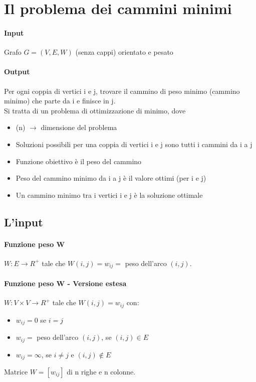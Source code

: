 \section{Il problema dei cammini minimi}
\paragraph*{Input} Grafo $G=(V,E,W)$ (senza cappi) orientato e pesato
\paragraph*{Output} Per ogni coppia di vertici i e j, trovare il cammino di peso minimo (cammino minimo)
che parte da i e finisce in j.\\
Si tratta di un problema di ottimizzazione di minimo, dove
\begin{itemize}
    \item (n) $\rightarrow$ dimensione del problema
    \item Soluzioni possibili per una coppia di vertici i e j sono tutti i cammini da i a j
    \item Funzione obiettivo è il peso del cammino
    \item Peso del cammino minimo da i a j è il valore ottimi (per i e j)
    \item Un cammino minimo tra i vertici i e j è la soluzione ottimale
\end{itemize}
\subsection{L'input}
\paragraph*{Funzione peso W} $W:E \rightarrow R^+$ tale che $W(i,j) = w_{ij} =$ peso dell'arco $(i,j)$.
\paragraph*{Funzione peso W - Versione estesa} $W:V \times V \rightarrow R^+$ tale che $W(i,j) = w_{ij}$ con:
\begin{itemize}
    \item $w_{ij} = 0$ se $i=j$
    \item $w_{ij} =$ peso dell'arco $(i,j)$, se $(i,j) \in E$
    \item $w_{ij} = \infty$, se $i \neq j$ e $(i,j) \notin E$ 
\end{itemize}
Matrice $W=[w_{ij}]$ di n righe e n colonne.
